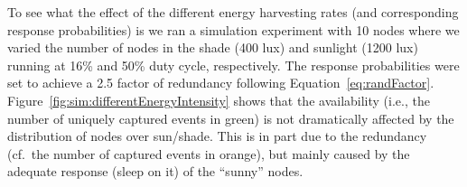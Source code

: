 To see what the effect of the different energy harvesting rates
(and corresponding response probabilities) is we ran a simulation
experiment with 10 nodes where we varied the number of nodes in the
shade (400 lux) and sunlight (1200 lux) running at 16\% and 50\% duty
cycle, respectively. The response probabilities were set to achieve
a 2.5 factor of redundancy following Equation~\ref{eq:randFactor}.
Figure~\ref{fig:sim:differentEnergyIntensity} shows that the \cis
availability (i.e., the number of uniquely captured events in green) is
not dramatically affected by the distribution of nodes over sun/shade.
This is in part due to the redundancy (cf.\ the number of captured events
in orange), but mainly caused by the adequate response (sleep on it)
of the ``sunny'' nodes.

